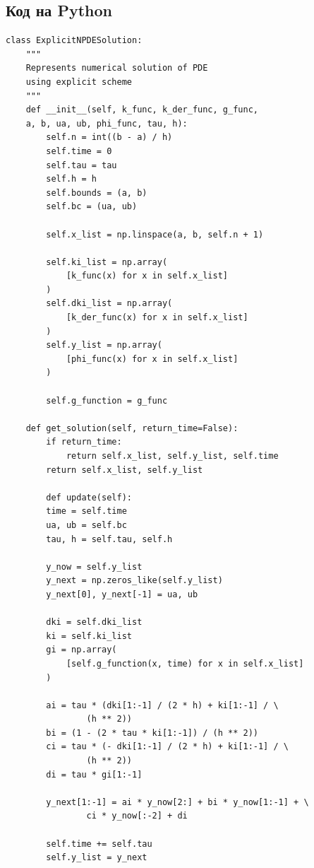 \documentclass[12pt]{article}%
\begin{document}
\subsection{Код на Python}
\begin{verbatim}
class ExplicitNPDESolution:
    """
    Represents numerical solution of PDE 
    using explicit scheme
    """
    def __init__(self, k_func, k_der_func, g_func, 
    a, b, ua, ub, phi_func, tau, h):
        self.n = int((b - a) / h)
        self.time = 0
        self.tau = tau
        self.h = h
        self.bounds = (a, b)
        self.bc = (ua, ub)

        self.x_list = np.linspace(a, b, self.n + 1)

        self.ki_list = np.array(
            [k_func(x) for x in self.x_list]
        )
        self.dki_list = np.array(
            [k_der_func(x) for x in self.x_list]
        )
        self.y_list = np.array(
            [phi_func(x) for x in self.x_list]
        )

        self.g_function = g_func

    def get_solution(self, return_time=False):
        if return_time:
            return self.x_list, self.y_list, self.time
        return self.x_list, self.y_list

        def update(self):
        time = self.time
        ua, ub = self.bc
        tau, h = self.tau, self.h

        y_now = self.y_list
        y_next = np.zeros_like(self.y_list)
        y_next[0], y_next[-1] = ua, ub

        dki = self.dki_list
        ki = self.ki_list
        gi = np.array(
            [self.g_function(x, time) for x in self.x_list]
        )
        
        ai = tau * (dki[1:-1] / (2 * h) + ki[1:-1] / \
                (h ** 2))
        bi = (1 - (2 * tau * ki[1:-1]) / (h ** 2))
        ci = tau * (- dki[1:-1] / (2 * h) + ki[1:-1] / \
                (h ** 2))
        di = tau * gi[1:-1]

        y_next[1:-1] = ai * y_now[2:] + bi * y_now[1:-1] + \
                ci * y_now[:-2] + di
        
        self.time += self.tau
        self.y_list = y_next
\end{verbatim}
\end{document}
